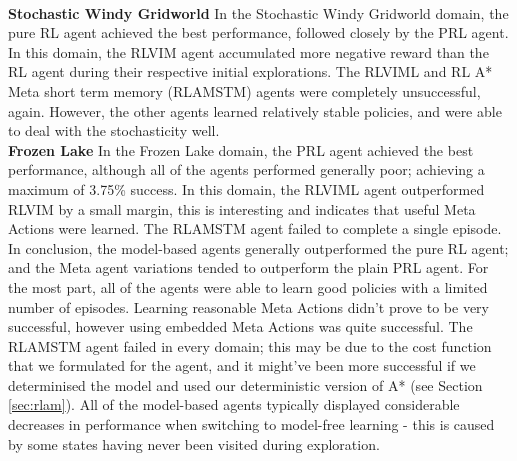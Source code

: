 \\\textbf{Stochastic Windy Gridworld} \quad In the Stochastic Windy Gridworld domain, the pure RL agent achieved the best performance, followed closely by the PRL agent. In this domain, the RLVIM agent accumulated more negative reward than the RL agent during their respective initial explorations. The RLVIML and RL A* Meta short term memory (RLAMSTM) agents were completely unsuccessful, again. However, the other agents learned relatively stable policies, and were able to deal with the stochasticity well.
\\\textbf{Frozen Lake} \quad In the Frozen Lake domain, the PRL agent achieved the best performance, although all of the agents performed generally poor; achieving a maximum of 3.75\% success. In this domain, the RLVIML agent outperformed RLVIM by a small margin, this is interesting and indicates that useful Meta Actions were learned. The RLAMSTM agent failed to complete a single episode.
\\In conclusion, the model-based agents generally outperformed the pure RL agent; and the Meta agent variations tended to outperform the plain PRL agent. For the most part, all of the agents were able to learn good policies with a limited number of episodes. Learning reasonable Meta Actions didn't prove to be very successful, however using embedded Meta Actions was quite successful. The RLAMSTM agent failed in every domain; this may be due to the cost function that we formulated for the agent, and it might've been more successful if we determinised the model and used our deterministic version of A* (see Section \ref{sec:rlam}). All of the model-based agents typically displayed considerable decreases in performance when switching to model-free learning - this is caused by some states having never been visited during exploration. 



